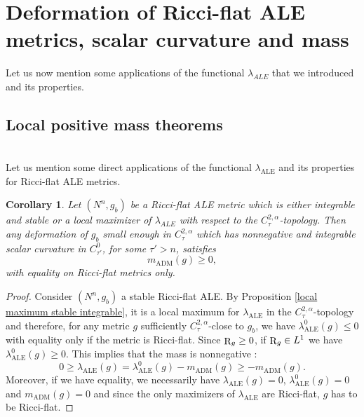 \documentclass[a4paper,11pt,reqno]{amsart}
\newtheorem{coro}[defn]{Corollary}
\def\R{\mathop{\rm R}\nolimits}
\numberwithin{equation}{section}
\begin{document}
	
	
	
	\section{Deformation of Ricci-flat ALE metrics, scalar curvature and mass}\label{sec-covid-mass}
	
	Let us now mention some applications of the functional ${\lambda}_{ALE}$ that we introduced and its properties. 
	
	\subsection{Local positive mass theorems}~~\\
	
	Let us mention some direct applications of the functional $\lambda_{\operatorname{ALE}}$ and its properties for Ricci-flat ALE metrics.
	
	\begin{coro}\label{local positive mass}
		Let $(N^n,g_b)$ be a Ricci-flat ALE metric which is either \emph{integrable} and \emph{stable} or a local maximizer of ${\lambda}_{ALE}$ with respect to the $C^{2,\alpha}_\tau$-topology. Then any deformation of $g_b$ small enough in $C^{2,\alpha}_\tau$ which has nonnegative and integrable scalar curvature in $C^0_{\tau'}$, for some $\tau'>n$, satisfies
		$$m_{\operatorname{ADM}}(g)\geq 0,$$
		with equality on Ricci-flat metrics only.
	\end{coro}
	\begin{proof}
		Consider $(N^n,g_b)$ a stable Ricci-flat ALE. By Proposition \ref{local maximum stable integrable}, it is a local maximum for ${\lambda}_{\operatorname{ALE}}$ in the $C^{2,\alpha}_\tau$-topology and therefore, for any metric $g$ sufficiently $C^{2,\alpha}_\tau$-close to $g_b$, we have $\lambda_{\operatorname{ALE}}^0(g)\leq 0$ with equality only if the metric is Ricci-flat. Since $\R_g\geq 0$, if $\R_g\in L^1$ we have $\lambda_{\operatorname{ALE}}^0(g)\geq 0$. This implies that the mass is nonnegative : $$0\geq\lambda_{\operatorname{ALE}}(g) = \lambda_{\operatorname{ALE}}^0(g)-m_{\operatorname{ADM}}(g)\geq -m_{\operatorname{ADM}}(g).$$
		Moreover, if we have equality, we necessarily have $\lambda_{\operatorname{ALE}}(g)= 0$, $\lambda_{\operatorname{ALE}}^0(g)= 0$ and $m_{\operatorname{ADM}}(g)=0$ and since the only maximizers of $\lambda_{\operatorname{ALE}}$ are Ricci-flat, $g$ has to be Ricci-flat.
	\end{proof}
	
\end{document}
